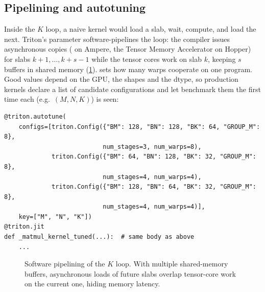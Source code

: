 \subsection{Pipelining and autotuning}
Inside the $K$ loop, a naive kernel would load a slab, wait, compute, and load the next.
Triton's  parameter software-pipelines the loop: the compiler issues
asynchronous copies ( on Ampere, the Tensor Memory Accelerator on Hopper)
for slabs $k+1,\dots,k+s-1$ while the tensor cores work on slab $k$, keeping $s$ buffers
in shared memory (\cref{fig:triton:pipeline}).  sets how many warps
cooperate on one program. Good values depend on the GPU, the shapes and the dtype, so
production kernels declare a list of candidate configurations and let
 benchmark them the first time each  (e.g.\ $(M,N,K)$)
is seen:

\begin{lstlisting}[caption={Declaring autotuning configurations (GPU only).},label={lst:triton:autotune}]
@triton.autotune(
    configs=[triton.Config({"BM": 128, "BN": 128, "BK": 64, "GROUP_M": 8},
                           num_stages=3, num_warps=8),
             triton.Config({"BM": 64, "BN": 128, "BK": 32, "GROUP_M": 8},
                           num_stages=4, num_warps=4),
             triton.Config({"BM": 128, "BN": 64, "BK": 32, "GROUP_M": 8},
                           num_stages=4, num_warps=4)],
    key=["M", "N", "K"])
@triton.jit
def _matmul_kernel_tuned(...):  # same body as above
    ...
\end{lstlisting}

\begin{figure}[t]
\centering
{}
\caption{Software pipelining of the $K$ loop. With multiple shared-memory buffers,
asynchronous loads of future slabs overlap tensor-core work on the current one, hiding
memory latency.}
\label{fig:triton:pipeline}
\end{figure}

